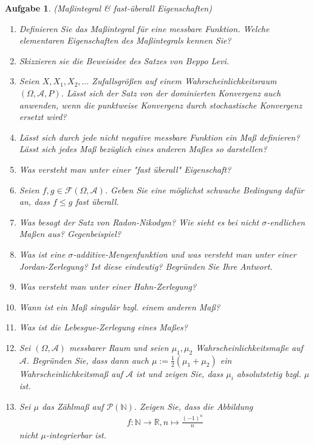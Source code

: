 \documentclass[11pt, a4paper, ngerman]{article}
\newcommand{\N}{\mathbb{N}}
\newcommand{\R}{\mathbb{R}}
\newtheorem{aufgabe}{Aufgabe}
\begin{document}
\begin{aufgabe} (Maßintegral \& fast-überall Eigenschaften)
    \begin{enumerate}
        \item 
        Definieren Sie das Maßintegral für eine messbare Funktion. Welche elementaren Eigenschaften des Maßintegrals kennen Sie?  
        \item
        Skizzieren sie die Beweisidee des Satzes von Beppo Levi. 
        \item 
        Seien $X, X_1, X_2,...$ Zufallsgrößen auf einem Wahrscheinlichkeitsraum $(\Omega, \mathcal{A},P)$. Lässt sich der Satz von der dominierten Konvergenz auch anwenden, wenn die punktweise Konvergenz durch stochastische Konvergenz ersetzt wird? 
        \item 
        Lässt sich durch jede nicht negative messbare Funktion ein Maß definieren? Lässt sich jedes Maß bezüglich eines anderen Maßes so darstellen?
        \item 
        Was versteht man unter einer "fast überall" Eigenschaft?
        \item 
        Seien $f,g \in \mathcal{F}(\Omega, \mathcal{A})$. Geben Sie eine möglichst schwache Bedingung dafür an, dass $f \leq g$ fast überall.
        \item 
        Was besagt der Satz von Radon-Nikodym? Wie sieht es bei nicht $\sigma$-endlichen Maßen aus? Gegenbeispiel?
        \item 
        Was ist eine $\sigma$-additive-Mengenfunktion und was versteht man unter einer Jordan-Zerlegung? Ist diese eindeutig? Begründen Sie Ihre Antwort. 
        \item 
        Was versteht man unter einer Hahn-Zerlegung?
        \item 
        Wann ist ein Maß singulär bzgl. einem anderen Maß? 
        \item 
        Was ist die Lebesgue-Zerlegung eines Maßes?
        \item 
        Sei $(\Omega, \mathcal{A})$ messbarer Raum und seien $\mu_1, \mu_2$ Wahrscheinlichkeitsmaße auf $\mathcal{A}$. Begründen Sie, dass dann auch $\mu := \frac{1}{2}(\mu_1 + \mu_2)$
        ein Wahrscheinlichkeitsmaß auf $\mathcal{A}$ ist und zeigen Sie, dass $\mu_i$ absolutstetig bzgl. $\mu$ ist. 
        \item 
        Sei $\mu$ das Zählmaß auf $\mathcal{P}(\N)$. Zeigen Sie, dass die Abbildung
        \begin{align*}
            f: \N \to \R, n \mapsto \frac{(-1)^n}{n}
        \end{align*}
        nicht $\mu$-integrierbar ist. 

    
    \end{enumerate}
\end{aufgabe}
\end{document}
